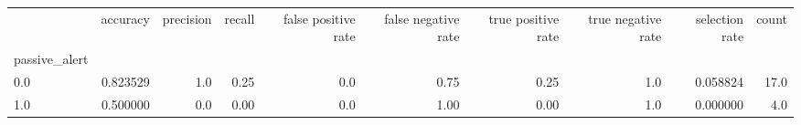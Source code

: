 \begin{tabular}{lrrrrrrrrr}
\toprule
{} &  accuracy &  precision &  recall &  false positive rate &  false negative rate &  true positive rate &  true negative rate &  selection rate &  count \\
passive\_alert &           &            &         &                      &                      &                     &                     &                 &        \\
\midrule
0.0           &  0.823529 &        1.0 &    0.25 &                  0.0 &                 0.75 &                0.25 &                 1.0 &        0.058824 &   17.0 \\
1.0           &  0.500000 &        0.0 &    0.00 &                  0.0 &                 1.00 &                0.00 &                 1.0 &        0.000000 &    4.0 \\
\bottomrule
\end{tabular}
